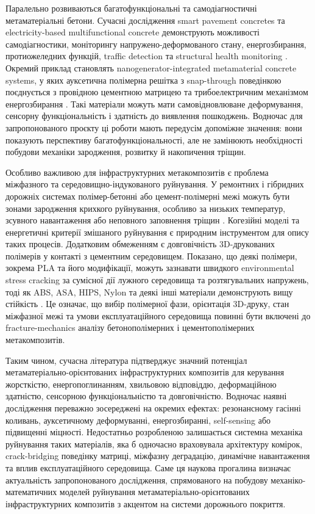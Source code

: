 \documentclass[12pt,a4paper]{article}
\begin{document}
Паралельно розвиваються багатофункціональні та самодіагностичні метаматеріальні бетони. Сучасні дослідження smart pavement concretes та electricity-based multifunctional concrete демонструють можливості самодіагностики, моніторингу напружено-деформованого стану, енергозбирання, протиожеледних функцій, traffic detection та structural health monitoring \cite{Dong2023,Qin2024}. Окремий приклад становлять nanogenerator-integrated metamaterial concrete systems, у яких ауксетична полімерна решітка з snap-through поведінкою поєднується з провідною цементною матрицею та трибоелектричним механізмом енергозбирання \cite{Barri2023}. Такі матеріали можуть мати самовідновлюване деформування, сенсорну функціональність і здатність до виявлення пошкоджень. Водночас для запропонованого проєкту ці роботи мають передусім допоміжне значення: вони показують перспективу багатофункціональності, але не замінюють необхідності побудови механіки зародження, розвитку й накопичення тріщин.

Особливо важливою для інфраструктурних метакомпозитів є проблема міжфазного та середовищно-індукованого руйнування. У ремонтних і гібридних дорожніх системах полімер-бетонні або цемент-полімерні межі можуть бути зонами зародження крихкого руйнування, особливо за низьких температур, зсувного навантаження або неповного заповнення тріщин \cite{Zhang2025}. Когезійні моделі та енергетичні критерії змішаного руйнування є природним інструментом для опису таких процесів. Додатковим обмеженням є довговічність 3D-друкованих полімерів у контакті з цементним середовищем. Показано, що деякі полімери, зокрема PLA та його модифікації, можуть зазнавати швидкого environmental stress cracking за сумісної дії лужного середовища та розтягувальних напружень, тоді як ABS, ASA, HIPS, Nylon та деякі інші матеріали демонструють вищу стійкість \cite{Jipa2022}. Це означає, що вибір полімерної фази, орієнтація 3D-друку, стан міжфазної межі та умови експлуатаційного середовища повинні бути включені до fracture-mechanics аналізу бетонополімерних і цементополімерних метакомпозитів.

Таким чином, сучасна література підтверджує значний потенціал метаматеріально-орієнтованих інфраструктурних композитів для керування жорсткістю, енергопоглинанням, хвильовою відповіддю, деформаційною здатністю, сенсорною функціональністю та довговічністю. Водночас наявні дослідження переважно зосереджені на окремих ефектах: резонансному гасінні коливань, ауксетичному деформуванні, енергозбиранні, self-sensing або підвищенні міцності. Недостатньо розробленою залишається системна механіка руйнування таких матеріалів, яка б одночасно враховувала архітектуру комірок, crack-bridging поведінку матриці, міжфазну деградацію, динамічне навантаження та вплив експлуатаційного середовища. Саме ця наукова прогалина визначає актуальність запропонованого дослідження, спрямованого на побудову механіко-математичних моделей руйнування метаматеріально-орієнтованих інфраструктурних композитів з акцентом на системи дорожнього покриття.
\end{document}

